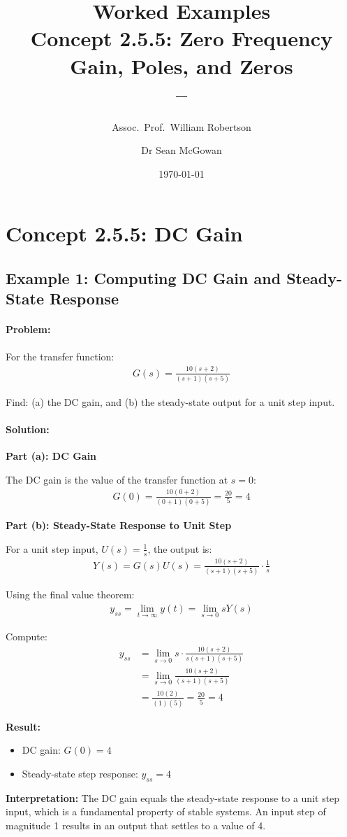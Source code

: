 \documentclass[11pt,a4paper]{article}
\title{\textbf{Worked Examples}\\[0.5em]
\large Concept 2.5.5: Zero Frequency Gain, Poles, and Zeros\\[0.3em]
\normalsize \coursesubtitle{} -- \coursetitle}
\author{Assoc.\ Prof.\ William Robertson \and Dr Sean McGowan}
\date{\today}
\begin{document}
\maketitle
\tableofcontents
\newpage

\section{Concept 2.5.5: DC Gain}

\subsection{Example 1: Computing DC Gain and Steady-State Response}

\paragraph{Problem:} For the transfer function:
\begin{align}
  G(s) = \frac{10(s+2)}{(s+1)(s+5)}
\end{align}

Find: (a) the DC gain, and (b) the steady-state output for a unit step input.

\paragraph{Solution:}

\textbf{Part (a): DC Gain}

The DC gain is the value of the transfer function at $s = 0$:
\begin{align}
  G(0) = \frac{10(0+2)}{(0+1)(0+5)} = \frac{20}{5} = 4
\end{align}

\textbf{Part (b): Steady-State Response to Unit Step}

For a unit step input, $U(s) = \frac{1}{s}$, the output is:
\begin{align}
  Y(s) = G(s)U(s) = \frac{10(s+2)}{(s+1)(s+5)} \cdot \frac{1}{s}
\end{align}

Using the final value theorem:
\begin{align}
  y_{ss} = \lim_{t \to \infty} y(t) = \lim_{s \to 0} sY(s)
\end{align}

Compute:
\begin{align}
  y_{ss} &= \lim_{s \to 0} s \cdot \frac{10(s+2)}{s(s+1)(s+5)} \\
  &= \lim_{s \to 0} \frac{10(s+2)}{(s+1)(s+5)} \\
  &= \frac{10(2)}{(1)(5)} = \frac{20}{5} = 4
\end{align}

\textbf{Result:}
\begin{itemize}
  \item DC gain: $G(0) = 4$
  \item Steady-state step response: $y_{ss} = 4$
\end{itemize}

\textbf{Interpretation:} The DC gain equals the steady-state response to a unit step input, which is a fundamental property of stable systems. An input step of magnitude 1 results in an output that settles to a value of 4.
\end{document}
